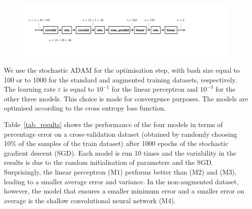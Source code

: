 \documentclass{article}
\begin{document}
\begin{figure}[H]
\centering
\includegraphics[width=\textwidth, clip=true,trim=80 200 520 200]{fig/conv3.pdf}
\end{figure}



We use the stochastic ADAM for the optimisation step, with bash size equal to 100 or to 1000  for the standard and augmented training datasets, respectively. 
The learning rate $\varepsilon$ is equal to  $10^{-1}$ for the linear perceptron and $10^{-3}$ for the other three models. 
This choice is made  for convergence purposes. 
The models are optimised according to the cross entropy loss function. 

Table~\ref{tab_results} shows the performance of the four models in terms of percentage error on a cross-validation dataset (obtained by randomly choosing 10\% of the samples of the train dataset) after 1000 epochs of the stochastic gradient descent (SGD). 
Each model is run 10 times and the variability in the results is due to the random initialisation of parameters and the SGD.
Surprisingly, the linear perceptron (M1) performs better than (M2) and (M3), leading to a smaller average error and variance. 
In the non-augmented dataset, however, the model that ensures a smaller minimum error and a smaller error on average is the shallow convolutional neural network (M4).
\end{document}
